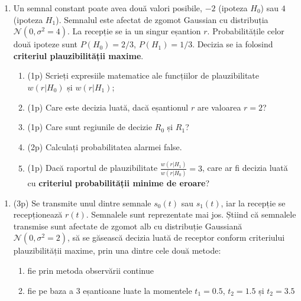 \documentclass[12pt,]{scrartcl}
\providecommand{\tightlist}{%
  \setlength{\itemsep}{0pt}\setlength{\parskip}{0pt}}
\begin{document}
\begin{enumerate}
\def\labelenumi{\arabic{enumi}.}
\setcounter{enumi}{1}
\tightlist
\item
  Un semnal constant poate avea două valori posibile, \(-2\) (ipoteza
  \(H_0\)) sau \(4\) (ipoteza \(H_1\)). Semnalul este afectat de zgomot
  Gaussian cu distribuția \(\mathcal{N}(0, \sigma^2=4)\). La recepție se
  ia un singur eșantion \(r\). Probabilitățile celor două ipoteze sunt
  \(P(H_0) = 2/3\), \(P(H_1) = 1/3\). Decizia se ia folosind
  \textbf{criteriul plauzibilității maxime}.

  \begin{enumerate}
  \def\labelenumii{\alph{enumii}.}
  \setcounter{enumii}{1}
  \tightlist
  \item
    (1p) Scrieți expresiile matematice ale funcțiilor de plauzibilitate
    \(w(r|H_0)\) și \(w(r|H_1)\);
  \item
    (1p) Care este decizia luată, dacă eșantionul \(r\) are valoarea
    \(r = 2\)?
  \item
    (1p) Care sunt regiunile de decizie \(R_0\) și \(R_1\)?
  \item
    (2p) Calculați probabilitatea alarmei false.
  \item
    (1p) Dacă raportul de plauzibilitate
    \(\frac{w(r|H_1)}{w(r|H_0)} = 3\), care ar fi decizia luată cu
    \textbf{criteriul probabilității minime de eroare}?
  \end{enumerate}
\end{enumerate}

\smallbreak

\begin{enumerate}
\def\labelenumi{\arabic{enumi}.}
\setcounter{enumi}{2}
\tightlist
\item
  (3p) Se transmite unul dintre semnale \(s_0(t)\) sau \(s_1(t)\), iar
  la recepție se recepționează \(r(t)\). Semnalele sunt reprezentate mai
  jos. Știind că semnalele transmise sunt afectate de zgomot alb cu
  distribuție Gaussiană \(\mathcal{N}(0, \sigma^2=2)\), să se găsească
  decizia luată de receptor conform criteriului plauzibilității maxime,
  prin una dintre cele două metode:

  \begin{enumerate}
  \def\labelenumii{\roman{enumii}.}
  \tightlist
  \item
    fie prin metoda observării continue
  \item
    fie pe baza a 3 eșantioane luate la momentele \(t_1 = 0.5\),
    \(t_2 = 1.5\) și \(t_2 = 3.5\)
  \end{enumerate}
\end{enumerate}
\end{document}
